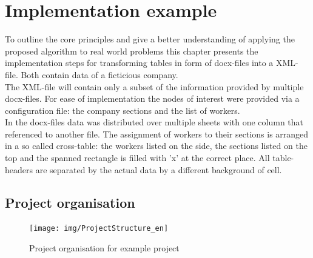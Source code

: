 \documentclass[conference]{IEEEtran}
\begin{document}
\section{Implementation example}
To outline the core principles and give a better understanding of applying the proposed algorithm
to real world problems this chapter presents the implementation steps for transforming tables in
form of docx-files into a XML-file. Both contain data of a ficticious company.\\The XML-file will
contain only a subset of the information provided by multiple docx-files. For ease of
implementation the nodes of interest were provided via a configuration file: the company sections
and the list of workers.\\
In the docx-files data was distributed over multiple sheets with one column that referenced to
another file. The assignment of workers to their sections is arranged in a so called cross-table:
the workers listed on the side, the sections listed on the top and the spanned rectangle is filled
with 'x' at the correct place. All table-headers are separated by the actual data by a different
background of cell.

\subsection{Project organisation}
\begin{figure}[h]
 \centering
 \texttt{[image: img/ProjectStructure\_en]}
 \caption{Project organisation for example project}
 \label{project_structure}
\end{figure}
\end{document}

